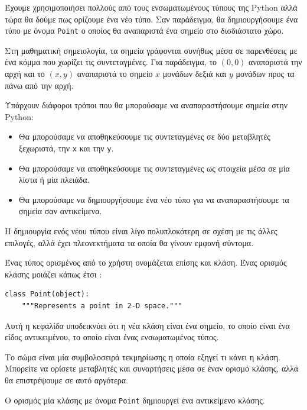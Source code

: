 \documentclass[10pt]{book}
\begin{document}
Έχουμε χρησιμοποιήσει πολλούς από τους ενσωματωμένους τύπους της  Python  αλλά τώρα 
θα δούμε πως ορίζουμε ένα νέο τύπο. Σαν παράδειγμα, θα δημιουργήσουμε ένα τύπο με όνομα  {\tt Point}  ο οποίος θα αναπαριστά ένα σημείο στο δισδιάστατο χώρο.

Στη μαθηματική σημειολογία, τα σημεία γράφονται συνήθως μέσα σε παρενθέσεις με ένα κόμμα που χωρίζει τις συντεταγμένες. Για παράδειγμα, το $(0,0)$ αναπαριστά την αρχή και το $(x,y)$ αναπαριστά το σημείο $x$ μονάδων δεξιά και $y$ μονάδων προς τα πάνω από την αρχή.

Υπάρχουν διάφοροι τρόποι που θα μπορούσαμε να αναπαραστήσουμε σημεία στην  Python:

\begin{itemize}


\item Θα μπορούσαμε να αποθηκεύσουμε τις συντεταγμένες σε δύο μεταβλητές ξεχωριστά, την  {\tt x}  και την  {\tt y}. 

\item Θα μπορούσαμε να αποθηκεύσουμε τις συντεταγμένες ως στοιχεία μέσα σε μία λίστα ή μία πλειάδα.

\item Θα μπορούσαμε να δημιουργήσουμε ένα νέο τύπο για να αναπαραστήσουμε τα σημεία σαν αντικείμενα.
 
\end{itemize}

 Η δημιουργία ενός νέου τύπου είναι λίγο πολυπλοκότερη σε σχέση με τις άλλες επιλογές, αλλά 
έχει πλεονεκτήματα τα οποία θα γίνουν εμφανή σύντομα.

Ένας τύπος ορισμένος από το χρήστη ονομάζεται επίσης και κλάση. Ένας ορισμός κλάσης μοιάζει  κάπως έτσι :

\begin{verbatim}
class Point(object):
    """Represents a point in 2-D space."""
\end{verbatim}
%
 Αυτή η κεφαλίδα υποδεικνύει ότι η νέα κλάση είναι ένα σημείο, το οποίο είναι ένα είδος 
αντικειμένου, το οποίο είναι ένας ενσωματωμένος τύπος.

Το σώμα είναι μία συμβολοσειρά τεκμηρίωσης η οποία εξηγεί τι κάνει η κλάση. Μπορείτε να ορίσετε μεταβλητές και συναρτήσεις μέσα σε έναν ορισμό κλάσης, αλλά θα επιστρέψουμε σε αυτό αργότερα.

Ο ορισμός μία κλάσης με όνομα  {\tt Point}  δημιουργεί ένα αντικείμενο κλάσης. 
\end{document}

